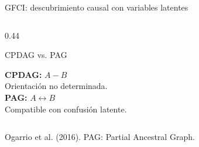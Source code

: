 \documentclass[aspectratio=169,11pt]{beamer}
\begin{document}
\begin{frame}[t]{GFCI: descubrimiento causal con variables latentes}
\begin{columns}[T,onlytextwidth]
\begin{column}{0.44\textwidth}
  \vspace{-0.12cm}

  \begin{exampleblock}{CPDAG vs. PAG}
    \small
    \centering

    \textbf{CPDAG:} $A-B$\\[-0.04cm]
    {\scriptsize Orientación no determinada.}\\[0.07cm]

    \textbf{PAG:} $A\leftrightarrow B$\\[-0.04cm]
    {\scriptsize Compatible con confusión latente.}

  \end{exampleblock}

\end{column}
  \end{columns}

  {\scriptsize\color{upmgray}
  Ogarrio et al. (2016). PAG: Partial Ancestral Graph.}
\end{frame}
\end{document}
